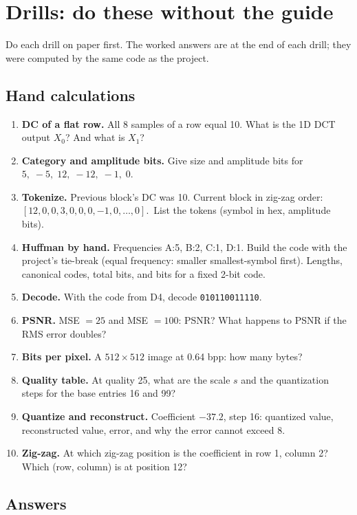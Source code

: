 \chapter{Drills: do these without the guide}\label{ch:drills}

Do each drill on paper first. The worked answers are at the end of each drill; they were computed by the same code as the project.

\section{Hand calculations}

\begin{enumerate}[label=\textbf{D\arabic*.},leftmargin=1.2cm]
\item \textbf{DC of a flat row.} All 8 samples of a row equal 10. What is the 1D DCT output $X_0$? And what is $X_1$?
\item \textbf{Category and amplitude bits.} Give size and amplitude bits for $5,\;-5,\;12,\;-12,\;-1,\;0$.
\item \textbf{Tokenize.} Previous block's DC was 10. Current block in zig-zag order: $[12,0,0,3,0,0,0,-1,0,\dots,0]$.\ List the tokens (symbol in hex, amplitude bits).
\item \textbf{Huffman by hand.} Frequencies A:5, B:2, C:1, D:1. Build the code with the project's tie-break (equal frequency: smaller smallest-symbol first). Lengths, canonical codes, total bits, and bits for a fixed 2-bit code.
\item \textbf{Decode.} With the code from D4, decode \texttt{010110011110}.
\item \textbf{PSNR.} MSE $=25$ and MSE $=100$: PSNR? What happens to PSNR if the RMS error doubles?
\item \textbf{Bits per pixel.} A $512\times512$ image at 0.64 bpp: how many bytes?
\item \textbf{Quality table.} At quality 25, what are the scale $s$ and the quantization steps for the base entries 16 and 99?
\item \textbf{Quantize and reconstruct.} Coefficient $-37.2$, step 16: quantized value, reconstructed value, error, and why the error cannot exceed 8.
\item \textbf{Zig-zag.} At which zig-zag position is the coefficient in row 1, column 2? Which (row, column) is at position 12?
\end{enumerate}

\section{Answers}

